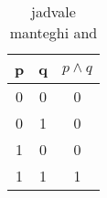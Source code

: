 	\begin{table}[h!]
		\centering
		\begin{tabular}{cc|c}
			p & q & $p \wedge q$ \\
			\hline 
			0 & 0 & 0\\
			0 & 1 & 0\\
			1 & 0 & 0\\
			1 & 1 & 1
		\end{tabular}
		\caption{jadvale manteghi and}
		\label{table:mantegh}
	\end{table}
	
	\newpage
	\setcounter{page}{10}